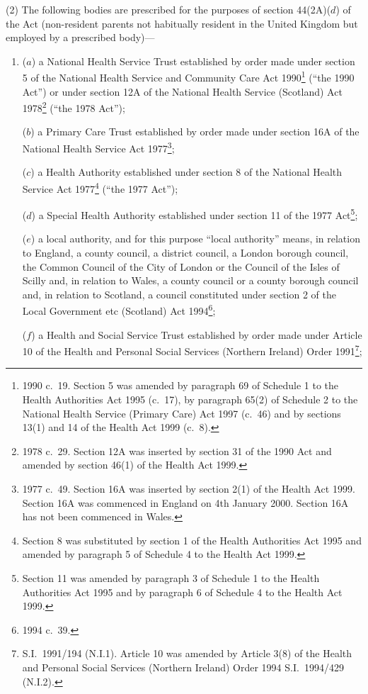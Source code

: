 \documentclass[12pt,a4paper]{article}
\begin{document}
(2) The following bodies are prescribed for the purposes of section 44(2A)($d$)  of the Act (non-resident parents not habitually resident in the United Kingdom but employed by a prescribed body)—
\begin{enumerate}\item[]
($a$) a National Health Service Trust established by order made under section 5 of the National Health Service and Community Care Act 1990\footnote{1990 c.\ 19. Section 5 was amended by paragraph 69 of Schedule 1 to the Health Authorities Act 1995 (c.\ 17), by paragraph 65(2) of Schedule 2 to the National Health Service (Primary Care) Act 1997 (c.\ 46) and by sections 13(1) and 14 of the Health Act 1999 (c.\ 8).} (“the 1990 Act”) or under section 12A of the National Health Service (Scotland) Act 1978\footnote{1978 c.\ 29. Section 12A was inserted by section 31 of the 1990 Act and amended by section 46(1) of the Health Act 1999.} (“the 1978 Act”);

($b$) a Primary Care Trust established by order made under section 16A of the National Health Service Act 1977\footnote{1977 c.\ 49. Section 16A was inserted by section 2(1) of the Health Act 1999. Section 16A was commenced in England on 4th January 2000. Section 16A has not been commenced in Wales.};

($c$) a Health Authority established under section 8 of the National Health Service Act 1977\footnote{Section 8 was substituted by section 1 of the Health Authorities Act 1995 and amended by paragraph 5 of Schedule 4 to the Health Act 1999.} (“the 1977 Act”);

($d$) a Special Health Authority established under section 11 of the 1977 Act\footnote{Section 11 was amended by paragraph 3 of Schedule 1 to the Health Authorities Act 1995 and by paragraph 6 of Schedule 4 to the Health Act 1999.};

($e$) a local authority, and for this purpose “local authority” means, in relation to England, a county council, a district council, a London borough council, the Common Council of the City of London or the Council of the Isles of Scilly and, in relation to Wales, a county council or a county borough council and, in relation to Scotland, a council constituted under section 2 of the Local Government etc (Scotland) Act 1994\footnote{1994 c.\ 39.};

($f$) a Health and Social Service Trust established by order made under Article 10 of the Health and Personal Social Services (Northern Ireland) Order 1991\footnote{S.I.\ 1991/194 (N.I.1). Article 10 was amended by Article 3(8) of the Health and Personal Social Services (Northern Ireland) Order 1994 S.I.\ 1994/429 (N.I.2).};


\end{enumerate}
\end{document}
